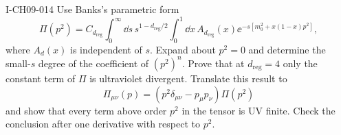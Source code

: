 \begin{exercise}{I-CH09-014}
Use Banks's parametric form
\[
  \Pi(p^2)=C_{d_{\mathrm{reg}}}\int_0^\infty\dd s\,s^{1-d_{\mathrm{reg}}/2}
  \int_0^1\dd x\,A_{d_{\mathrm{reg}}}(x)
  \ee^{-s[m_0^2+x(1-x)p^2]},
\]
where $A_d(x)$ is independent of $s$.  Expand about $p^2=0$ and determine the
small-$s$ degree of the coefficient of $(p^2)^n$.  Prove that at
$d_{\mathrm{reg}}=4$ only
the constant term of $\Pi$ is ultraviolet divergent.  Translate this result
to
\[
  \Pi_{\mu\nu}(p)=(p^2\delta_{\mu\nu}-p_\mu p_\nu)\Pi(p^2)
\]
and show that every term above order $p^2$ in the tensor is UV finite.  Check
the conclusion after one derivative with respect to $p^2$.
\end{exercise}
